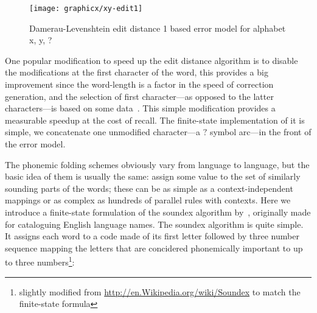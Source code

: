 \documentclass[a4paper,12pt]{article}
\begin{document}
\begin{figure}
    \centering
    \texttt{[image: graphicx/xy-edit1]}
    \caption{Damerau-Levenshtein edit distance 1 based error model for
        alphabet {x, y, ?}
    \label{fig:xy-edit-1}}
\end{figure}

One popular modification to speed up the edit distance algorithm is to disable
the modifications at the first character of the word, this provides a big
improvement since the word-length is a factor in the speed of correction
generation, and the selection of first character---as opposed to the latter
characters---is based on some data~\cite[]{bhagat2007spelling}.  This simple
modification provides a measurable speedup at the cost of recall. The
finite-state implementation of it is simple, we concatenate one unmodified
character---a $?$ symbol arc---in the front of the error model.

The phonemic folding schemes obviously vary from language to language, but
the basic idea of them is usually the same: assign some value to the set of similarly
sounding parts of the words; these can be as simple as a context-independent mappings
or as complex as hundreds of parallel rules with contexts. Here we introduce a
finite-state formulation of the soundex algorithm by~\cite{russell1918soundex},
originally made for cataloguing English language names. The soundex algorithm
is quite simple. It assigns each word to a code made of its first letter followed by three
number sequence mapping the letters that are concidered phonemically important
to up to three numbers\footnote{slightly modified from
\url{http://en.Wikipedia.org/wiki/Soundex} to match the finite-state formula}:
\end{document}

